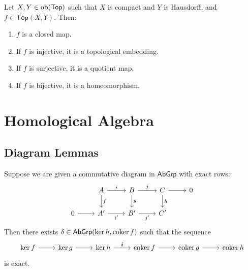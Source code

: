 \begin{lemma}
	Let $X,Y \in \operatorname{ob}(\mathsf{Top})$ such that $X$ is compact and $Y$ is Hausdorff, and $f \in \mathsf{Top}(X,Y)$. Then:
	\begin{enumerate}[label = \textup{(}\alph*\textup{)},wide = 0pt]
		\item $f$ is a closed map.
		\item If $f$ is injective, it is a topological embedding.
		\item If $f$ is surjective, it is a quotient map.
		\item If $f$ is bijective, it is a homeomorphism.
	\end{enumerate}
	\label{lem:closed_map_lemma}
\end{lemma}

\section*{Homological Algebra}
\subsection*{Diagram Lemmas}
\begin{proposition}
	Suppose we are given a commutative diagram in $\mathsf{AbGrp}$ with exact rows:
	\begin{equation*}
		\begin{tikzcd}
			& A \arrow[r,"i"]\arrow[d,"f"] & B \arrow[r,"j"]\arrow[d,"g"] & C \arrow[r]\arrow[d,"h"] & 0\\
			0 \arrow[r] & A' \arrow[r,"i'"'] & B' \arrow[r,"j'"'] & C'
		\end{tikzcd}
	\end{equation*}
	Then there exists $\delta \in \mathsf{AbGrp}(\ker h,\operatorname{coker} f)$ such that the sequence
	\begin{equation}
		\begin{tikzcd}
			 \ker f \arrow[r] & \ker g \arrow[r] & \ker h \arrow[r,"\delta"] & \coker f \arrow[r] & \coker g \arrow[r] & \coker h
		 \end{tikzcd}
	\end{equation}
	\noindent is exact.
	\label{prop:snake_lemma}
\end{proposition}

